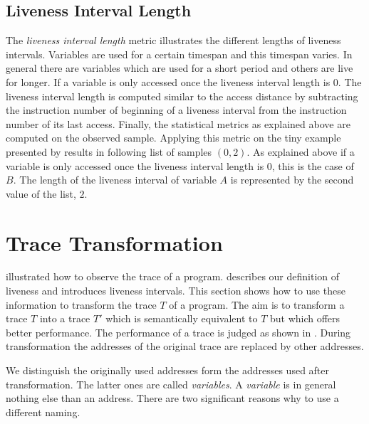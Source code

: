 \documentclass[onecolumn, openright, master, english, signatures]{dbrgrptt}
\begin{document}
\subsection{Liveness Interval Length}\label{ssec:metric-liveness-interval-length}
The \emph{liveness interval length} metric illustrates the different lengths of liveness intervals. Variables are used for a certain timespan and this timespan varies. In general there are variables which are used for a short period and others are live for longer. If a variable is only accessed once the liveness interval length is $0$. The liveness interval length is computed similar to the access distance by subtracting the instruction number of beginning of a liveness interval from the instruction number of its last access. Finally, the statistical metrics as explained above are computed on the observed sample. Applying this metric on the tiny example presented by  results in following list of samples $(0, 2)$. As explained above if a variable is only accessed once the liveness interval length is $0$, this is the case of $B$. The length of the liveness interval of variable $A$ is represented by the second value of the list, $2$.


\section{Trace Transformation}\label{sec:trace-transformation}

 illustrated how to observe the \ac{trace} of a program.  describes our definition of liveness and introduces liveness intervals. This section shows how to use these information to transform the \ac{trace} $T$ of a program. The aim is to transform a \ac{trace} $T$ into a \ac{trace} $T'$ which is semantically equivalent to $T$ but which offers better performance. The performance of a \ac{trace} is judged as shown in . During transformation the addresses of the original \ac{trace} are replaced by other addresses.

We distinguish the originally used addresses form the addresses used after transformation. The latter ones are called \emph{variables}. A \emph{variable} is in general nothing else than an address. There are two significant reasons why to use a different naming.
\end{document}
